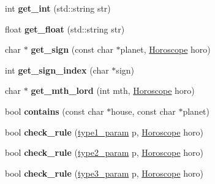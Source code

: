 \begin{DoxyCompactItemize}
\item 
\hypertarget{classasferparser_a8c59ec4f5844c91090f4d8d980835d7c}{int {\bfseries get\-\_\-int} (std\-::string str)}\label{classasferparser_a8c59ec4f5844c91090f4d8d980835d7c}

\item 
\hypertarget{classasferparser_ae925502b694ee6e3852dc9cb574eba0f}{float {\bfseries get\-\_\-float} (std\-::string str)}\label{classasferparser_ae925502b694ee6e3852dc9cb574eba0f}

\item 
\hypertarget{classasferparser_adaa00eebc16bc6f0aafbbc9c89982cbe}{char $\ast$ {\bfseries get\-\_\-sign} (const char $\ast$planet, \hyperlink{structHoroscope}{Horoscope} horo)}\label{classasferparser_adaa00eebc16bc6f0aafbbc9c89982cbe}

\item 
\hypertarget{classasferparser_aa8d66ae239036089ce3c5dcd40446950}{int {\bfseries get\-\_\-sign\-\_\-index} (char $\ast$sign)}\label{classasferparser_aa8d66ae239036089ce3c5dcd40446950}

\item 
\hypertarget{classasferparser_ad0df58af83ae8ba943126d2dff816192}{char $\ast$ {\bfseries get\-\_\-mth\-\_\-lord} (int mth, \hyperlink{structHoroscope}{Horoscope} horo)}\label{classasferparser_ad0df58af83ae8ba943126d2dff816192}

\item 
\hypertarget{classasferparser_a82ad96dcd1d13f6a904ae550fdf63b7f}{bool {\bfseries contains} (const char $\ast$house, const char $\ast$planet)}\label{classasferparser_a82ad96dcd1d13f6a904ae550fdf63b7f}

\item 
\hypertarget{classasferparser_ad5772a3ae410ad049cccaef3c76771fb}{bool {\bfseries check\-\_\-rule} (\hyperlink{structtype1__param}{type1\-\_\-param} p, \hyperlink{structHoroscope}{Horoscope} horo)}\label{classasferparser_ad5772a3ae410ad049cccaef3c76771fb}

\item 
\hypertarget{classasferparser_a68960d9a72667a568053040c03d339d4}{bool {\bfseries check\-\_\-rule} (\hyperlink{structtype2__param}{type2\-\_\-param} p, \hyperlink{structHoroscope}{Horoscope} horo)}\label{classasferparser_a68960d9a72667a568053040c03d339d4}

\item 
\hypertarget{classasferparser_a57cd571b4c3f6dd3b3e3ae025f54bd24}{bool {\bfseries check\-\_\-rule} (\hyperlink{structtype3__param}{type3\-\_\-param} p, \hyperlink{structHoroscope}{Horoscope} horo)}\label{classasferparser_a57cd571b4c3f6dd3b3e3ae025f54bd24}


\end{DoxyCompactItemize}
